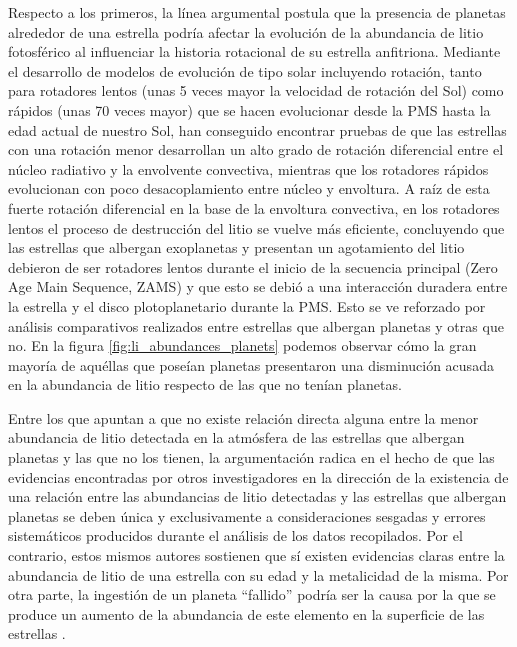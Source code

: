 Respecto a los primeros, la línea argumental postula que la presencia de planetas alrededor de una estrella podría afectar la evolución de la abundancia de litio fotosférico al influenciar la historia rotacional de su estrella anfitriona. Mediante el desarrollo de modelos de evolución de tipo solar incluyendo rotación, tanto para rotadores lentos (unas 5 veces mayor la velocidad de rotación del Sol) como rápidos (unas 70 veces mayor) que se hacen evolucionar desde la PMS hasta la edad actual de nuestro Sol, han conseguido encontrar pruebas de que las estrellas con una rotación menor desarrollan un alto grado de rotación diferencial entre el núcleo radiativo y la envolvente convectiva, mientras que los rotadores rápidos evolucionan con poco desacoplamiento entre núcleo y envoltura. A raíz de esta fuerte rotación diferencial en la base de la envoltura convectiva, en los rotadores lentos el proceso de destrucción del litio se vuelve más eficiente, concluyendo que las estrellas que albergan exoplanetas y presentan un agotamiento del litio debieron de ser rotadores lentos durante el inicio de la secuencia principal (Zero Age Main Sequence, ZAMS) y que esto se debió a una interacción duradera entre la estrella y el disco plotoplanetario durante la PMS. Esto se ve reforzado por análisis comparativos realizados entre estrellas que albergan planetas y otras que no. En la figura \ref{fig:li_abundances_planets} podemos observar cómo la gran mayoría de aquéllas que poseían planetas presentaron una disminución acusada en la abundancia de litio respecto de las que no tenían planetas.\par

Entre los que apuntan a que no existe relación directa alguna entre la menor abundancia de litio detectada en la atmósfera de las estrellas que albergan planetas y las que no los tienen, la argumentación radica en el hecho de que las evidencias encontradas por otros investigadores en la dirección de la existencia de una relación entre las abundancias de litio detectadas y las estrellas que albergan planetas se deben única y exclusivamente a consideraciones sesgadas y errores sistemáticos producidos durante el análisis de los datos recopilados. Por el contrario, estos mismos autores sostienen que sí existen evidencias claras entre la abundancia de litio de una estrella con su edad y la metalicidad de la misma. Por otra parte, la ingestión de un planeta “fallido” podría ser la causa por la que se produce un aumento de la abundancia de este elemento en la superficie de las estrellas \citep{Bouvier2016, DelgadoMena2016}.\par

